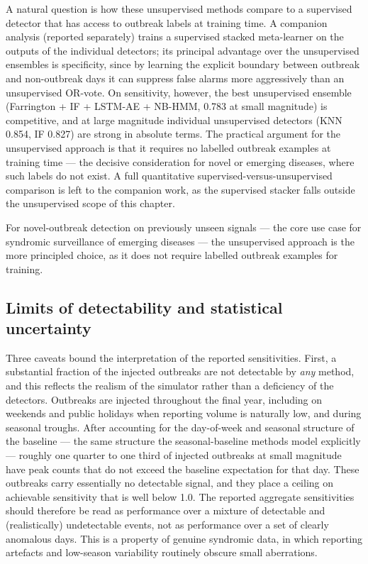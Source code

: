\documentclass[11pt]{article}
\begin{document}
A natural question is how these unsupervised methods compare to a supervised detector that has access to outbreak labels at training time. A companion analysis (reported separately) trains a supervised stacked meta-learner on the outputs of the individual detectors; its principal advantage over the unsupervised ensembles is specificity, since by learning the explicit boundary between outbreak and non-outbreak days it can suppress false alarms more aggressively than an unsupervised OR-vote. On sensitivity, however, the best unsupervised ensemble (Farrington + IF + LSTM-AE + NB-HMM, 0.783 at small magnitude) is competitive, and at large magnitude individual unsupervised detectors (KNN 0.854, IF 0.827) are strong in absolute terms. The practical argument for the unsupervised approach is that it requires no labelled outbreak examples at training time --- the decisive consideration for novel or emerging diseases, where such labels do not exist. A full quantitative supervised-versus-unsupervised comparison is left to the companion work, as the supervised stacker falls outside the unsupervised scope of this chapter.

For novel-outbreak detection on previously unseen signals --- the core use case for syndromic surveillance of emerging diseases --- the unsupervised approach is the more principled choice, as it does not require labelled outbreak examples for training.

\subsection{Limits of detectability and statistical uncertainty}

Three caveats bound the interpretation of the reported sensitivities. First, a substantial fraction of the injected outbreaks are not detectable by \textit{any} method, and this reflects the realism of the simulator rather than a deficiency of the detectors. Outbreaks are injected throughout the final year, including on weekends and public holidays when reporting volume is naturally low, and during seasonal troughs. After accounting for the day-of-week and seasonal structure of the baseline --- the same structure the seasonal-baseline methods model explicitly --- roughly one quarter to one third of injected outbreaks at small magnitude have peak counts that do not exceed the baseline expectation for that day. These outbreaks carry essentially no detectable signal, and they place a ceiling on achievable sensitivity that is well below 1.0. The reported aggregate sensitivities should therefore be read as performance over a mixture of detectable and (realistically) undetectable events, not as performance over a set of clearly anomalous days. This is a property of genuine syndromic data, in which reporting artefacts and low-season variability routinely obscure small aberrations.
\end{document}
